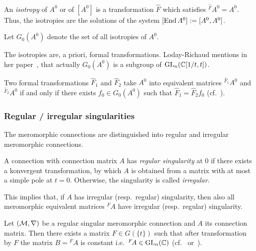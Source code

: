 \begin{defn}\label{defn:isotropies}
  An \emph{isotropy} of $A^0$ or of $[A^0]$ is a transformation
  $\hat F$ which satisfies ${}^{\hat F}\!A^0=A^0$.
  Thus, the isotropies are the solutions of the system
  $[\operatorname{End} A^0]:=[A^0,A^0]$.

  Let $G_0(A^0)$ denote the set of all isotropies of $A^0$.
  \begin{s-rem}
    The isotropies are, a priori, formal transformations.
    Loday-Richaud mentions in her paper~\cite[853]{Loday1994}, that
    actually $G_0(A^0)$ is a subgroup of $\operatorname{GL}_n(\mathbb{C}[1/t,t])$.
  \end{s-rem}
\end{defn}
\begin{lem}
  Two formal transformations $\hat F_1$ and $\hat F_2$ take $A^0$ into
  equivalent matrices ${}^{\hat F_1}\!A^0$ and  ${}^{\hat F_2}\!A^0$ if and
  only if there exists $f_0\in G_0(A^0)$ such that $\hat F_1=\hat F_2f_0$
  (cf.~\cite[854]{Loday1994}).
\end{lem}
\begin{comment}
  \begin{proof}
    \TODO[Look at \cite{BJL1979Birkhoff}?]
  \end{proof}
\end{comment}

\subsubsection{Regular / irregular singularities}
The meromorphic connections are distinguished into regular and irregular
meromorphic connections.
\begin{defn}
  A connection with connection matrix $A$ has \emph{regular singularity} at $0$
  if there exists a konvergent transformation, by which $A$ is obtained from a
  matrix with at most a simple pole at $t=0$.
  Otherwise, the singularity is called \emph{irregular}.
  \begin{s-rem}
    This implies that, if $A$ has irregular (resp.\ regular) singularity, then
    also all meromorphic equivalent matrices ${}^{F}\!A$ have irregular
    (resp.\ regular) singularity.
  \end{s-rem}
\end{defn}
\begin{thm}
  Let $(\mathcal{M},\nabla)$ be a regular singular meromorphic connection and $A$ its
  connection matrix.
  Then there exists a matrix $F\in G(\!\{t\}\!)$ such that after transformation
  by $F$ the matrix $B={}^F\!A$ is constant i.e.\ ${}^F\!A\in\operatorname{GL}_n(\mathbb{C})$
  (cf.~\cite[Thm.II.2.8]{sabbah2007isomonodromic}
  or~\cite[Sec.5.1.2]{hotta2008}).
\end{thm}

